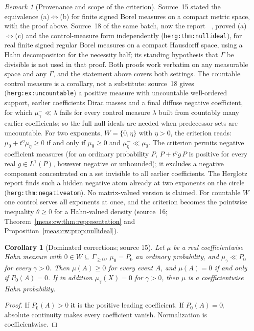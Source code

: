\documentclass[11pt]{article}
\numberwithin{equation}{section}
\newtheorem{corollary}[theorem]{Corollary}
\theoremstyle{definition}
\theoremstyle{remark}
\newtheorem{remark}[theorem]{Remark}
\begin{document}
\begin{remark}[Provenance and scope of the criterion]\label{meas:rem:nullideal}
Source~15 stated the equivalence (a)$\Leftrightarrow$(b) for finite signed Borel
measures on a compact metric space, with the proof above. Source~18 of the same
batch, now the report ~\cite{repoherg},
proved (a)$\Leftrightarrow$(c) and the control-measure form independently
(\texttt{herg:thm:nullideal}), for
real finite signed regular Borel measures on a compact Hausdorff space, using a
Hahn decomposition for the necessity half; its standing hypothesis that
$\Gamma$ be divisible is not used in that proof. Both
proofs work verbatim on any measurable space and any $\Gamma$, and the statement
above covers both settings. The countable control measure is a corollary, not a
substitute: source~18 gives (\texttt{herg:ex:uncountable}) a positive measure
with uncountable well-ordered
support, earlier coefficients Dirac masses and a final diffuse negative
coefficient, for which $\mu_\gamma^-\ll\lambda$ fails for every control measure
$\lambda$ built from countably many earlier coefficients; so the full null ideals
are needed when predecessor sets are uncountable. For two exponents,
$W=\{0,\eta\}$ with $\eta>0$, the criterion reads: $\mu_0+t^\eta\mu_\eta\ge0$ if and
only if $\mu_0\ge0$ and $\mu_\eta^-\ll\mu_0$. The criterion permits negative
coefficient measures (for an ordinary probability $P$, $P+t^\eta g\,P$ is positive
for every real $g\in L^1(P)$, however negative or unbounded); it excludes a
negative component concentrated on a set invisible to all earlier coefficients.
The Herglotz report finds such a hidden negative atom already at two exponents
on the circle (\texttt{herg:thm:negativeatom}).
No matrix-valued version is claimed. For countable $W$ one control serves all
exponents at once, and the criterion becomes the pointwise inequality
$\theta\ge0$ for a Hahn-valued density (source~16;
Theorem~\ref{meas:cw:thm:representation} and
Proposition~\ref{meas:cw:prop:nullideal}).
\end{remark}

\begin{corollary}[Dominated corrections; source 15]\label{meas:cor:dominated}
Let $\mu$ be a real coefficientwise Hahn measure with $0\in W\subseteq\Gamma_{\ge0}$,
$\mu_0=P_0$ an ordinary probability, and $\mu_\gamma\ll P_0$ for every $\gamma>0$.
Then $\mu(A)\ge0$ for every event $A$, and $\mu(A)=0$ if and only if $P_0(A)=0$.
If in addition $\mu_\gamma(X)=0$ for $\gamma>0$, then $\mu$ is a coefficientwise Hahn
probability.
\end{corollary}
\begin{proof}
If $P_0(A)>0$ it is the positive leading coefficient. If $P_0(A)=0$, absolute
continuity makes every coefficient vanish. Normalization is coefficientwise.
\end{proof}
\end{document}
